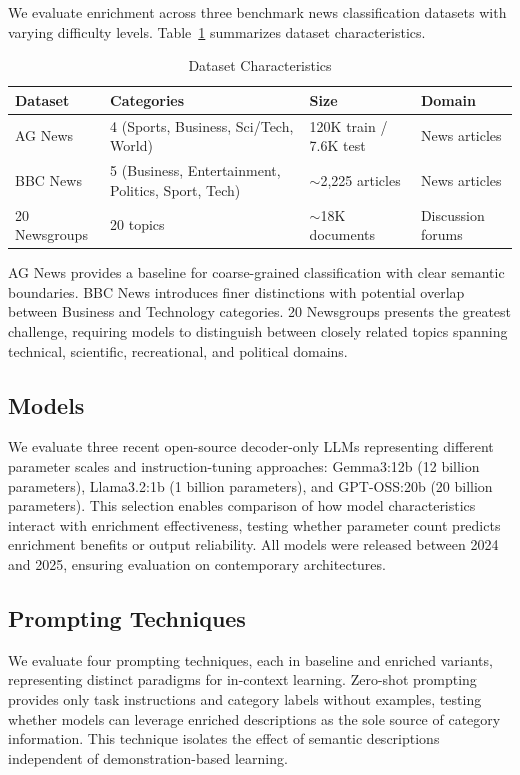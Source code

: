 \documentclass[sigconf,nonacm]{acmart}
\begin{document}
We evaluate enrichment across three benchmark news classification datasets with varying difficulty levels. Table~\ref{tab:datasets} summarizes dataset characteristics.

\begin{table}[h]
\centering
\small
\begin{tabular}{@{}p{1.8cm}p{2.2cm}p{1.5cm}p{1.2cm}@{}}
\toprule
\textbf{Dataset} & \textbf{Categories} & \textbf{Size} & \textbf{Domain} \\ 
\midrule
AG News & 4 (Sports, Business, Sci/Tech, World) & 120K train / 7.6K test & News articles \\
\midrule
BBC News & 5 (Business, Entertain\-ment, Politics, Sport, Tech) & $\sim$2,225 articles & News articles \\
\midrule
20 News\-groups & 20 topics & $\sim$18K documents & Discussion forums \\
\bottomrule
\end{tabular}
\caption{Dataset Characteristics}
\label{tab:datasets}
\end{table}

AG News provides a baseline for coarse-grained classification with clear semantic boundaries. BBC News introduces finer distinctions with potential overlap between Business and Technology categories. 20 Newsgroups presents the greatest challenge, requiring models to distinguish between closely related topics spanning technical, scientific, recreational, and political domains.

\subsection{Models}

We evaluate three recent open-source decoder-only LLMs representing different parameter scales and instruction-tuning approaches: Gemma3:12b (12 billion parameters), Llama3.2:1b (1 billion parameters), and GPT-OSS:20b (20 billion parameters). This selection enables comparison of how model characteristics interact with enrichment effectiveness, testing whether parameter count predicts enrichment benefits or output reliability. All models were released between 2024 and 2025, ensuring evaluation on contemporary architectures.

\subsection{Prompting Techniques}

We evaluate four prompting techniques, each in baseline and enriched variants, representing distinct paradigms for in-context learning. Zero-shot prompting provides only task instructions and category labels without examples, testing whether models can leverage enriched descriptions as the sole source of category information. This technique isolates the effect of semantic descriptions independent of demonstration-based learning.
\end{document}
